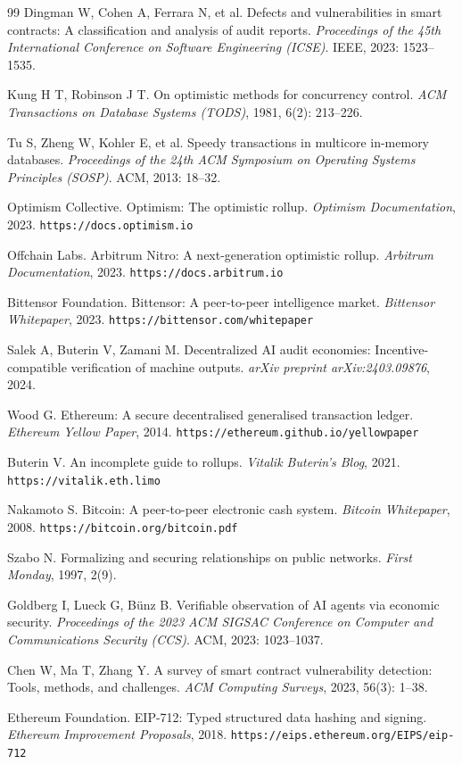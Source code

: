 \documentclass[10.5pt,compsoc]{CjC}
\begin{document}
\begin{thebibliography}{99}
Dingman W, Cohen A, Ferrara N, et al.
Defects and vulnerabilities in smart contracts: A classification and analysis of audit reports.
\emph{Proceedings of the 45th International Conference on Software Engineering (ICSE)}. IEEE, 2023: 1523--1535.

Kung H T, Robinson J T.
On optimistic methods for concurrency control.
\emph{ACM Transactions on Database Systems (TODS)}, 1981, 6(2): 213--226.

Tu S, Zheng W, Kohler E, et al.
Speedy transactions in multicore in-memory databases.
\emph{Proceedings of the 24th ACM Symposium on Operating Systems Principles (SOSP)}. ACM, 2013: 18--32.

Optimism Collective.
Optimism: The optimistic rollup.
\emph{Optimism Documentation}, 2023. \texttt{https://docs.optimism.io}

Offchain Labs.
Arbitrum Nitro: A next-generation optimistic rollup.
\emph{Arbitrum Documentation}, 2023. \texttt{https://docs.arbitrum.io}

Bittensor Foundation.
Bittensor: A peer-to-peer intelligence market.
\emph{Bittensor Whitepaper}, 2023. \texttt{https://bittensor.com/whitepaper}

Salek A, Buterin V, Zamani M.
Decentralized AI audit economies: Incentive-compatible verification of machine outputs.
\emph{arXiv preprint arXiv:2403.09876}, 2024.

Wood G.
Ethereum: A secure decentralised generalised transaction ledger.
\emph{Ethereum Yellow Paper}, 2014. \texttt{https://ethereum.github.io/yellowpaper}

Buterin V.
An incomplete guide to rollups.
\emph{Vitalik Buterin's Blog}, 2021. \texttt{https://vitalik.eth.limo}

Nakamoto S.
Bitcoin: A peer-to-peer electronic cash system.
\emph{Bitcoin Whitepaper}, 2008. \texttt{https://bitcoin.org/bitcoin.pdf}

Szabo N.
Formalizing and securing relationships on public networks.
\emph{First Monday}, 1997, 2(9).

Goldberg I, Lueck G, Bünz B.
Verifiable observation of AI agents via economic security.
\emph{Proceedings of the 2023 ACM SIGSAC Conference on Computer and Communications Security (CCS)}. ACM, 2023: 1023--1037.

Chen W, Ma T, Zhang Y.
A survey of smart contract vulnerability detection: Tools, methods, and challenges.
\emph{ACM Computing Surveys}, 2023, 56(3): 1--38.

Ethereum Foundation.
EIP-712: Typed structured data hashing and signing.
\emph{Ethereum Improvement Proposals}, 2018. \texttt{https://eips.ethereum.org/EIPS/eip-712}

\end{thebibliography}
\end{document}
